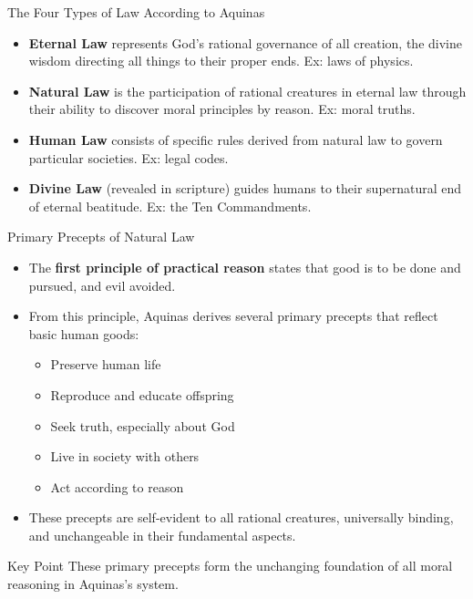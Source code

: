 \documentclass{beamer}
\begin{document}
\begin{frame}{The Four Types of Law According to Aquinas}
    \begin{itemize}
        \item \textbf{Eternal Law} represents God's rational governance of all creation, the divine wisdom directing all things to their proper ends. Ex: laws of physics.
        
        \item \textbf{Natural Law} is the participation of rational creatures in eternal law through their ability to discover moral principles by reason. Ex: moral truths.
        
        \item \textbf{Human Law} consists of specific rules derived from natural law to govern particular societies. Ex: legal codes.
         
        \item \textbf{Divine Law} (revealed in scripture) guides humans to their supernatural end of eternal beatitude. Ex: the Ten Commandments.
    \end{itemize}
\end{frame}

\begin{frame}{Primary Precepts of Natural Law}
    \begin{itemize}
        \item The \textbf{first principle of practical reason} states that good is to be done and pursued, and evil avoided.
        
        \item From this principle, Aquinas derives several primary precepts that reflect basic human goods:
        \begin{itemize}
            \item Preserve human life
            \item Reproduce and educate offspring
            \item Seek truth, especially about God
            \item Live in society with others
            \item Act according to reason
        \end{itemize}
        
        \item These precepts are self-evident to all rational creatures, universally binding, and unchangeable in their fundamental aspects.
    \end{itemize}
    
    \begin{alertblock}{Key Point}
        These primary precepts form the unchanging foundation of all moral reasoning in Aquinas's system.
    \end{alertblock}
\end{frame}
\end{document}
